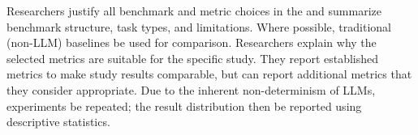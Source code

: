 Researchers \must justify all benchmark and metric choices in the \paper and \should summarize benchmark structure, task types, and limitations. Where possible, traditional (non-LLM) baselines \should be used for comparison. Researchers \must explain why the selected metrics are suitable for the specific study. They \should report established metrics to make study results comparable, but can report additional metrics that they consider appropriate. Due to the inherent non-determinism of LLMs, experiments \should be repeated; the result distribution \should then be reported using descriptive statistics.